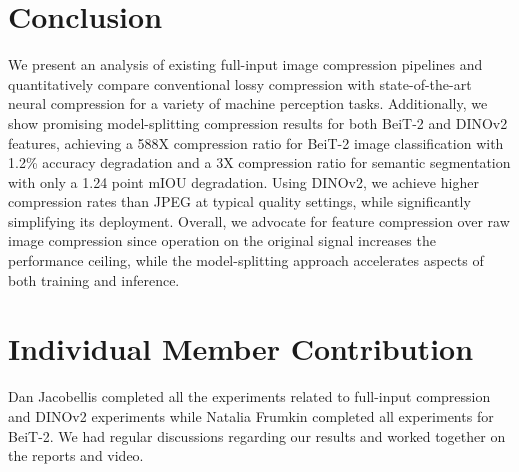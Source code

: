 \documentclass[10pt,twocolumn,letterpaper]{article}
\begin{document}


\section{Conclusion}
We present an analysis of existing full-input image compression pipelines and quantitatively compare conventional lossy compression with state-of-the-art neural compression for a variety of machine perception tasks. Additionally, we show promising model-splitting compression results for both BeiT-2 and DINOv2 features, achieving a 588X compression ratio for BeiT-2 image classification with 1.2\% accuracy degradation and a 3X compression ratio for semantic segmentation with only a 1.24 point mIOU degradation. Using DINOv2, we achieve higher compression rates than JPEG at typical quality settings, while significantly simplifying its deployment. Overall, we advocate for feature compression over raw image compression since operation on the original signal increases the performance ceiling, while the model-splitting approach accelerates aspects of both training and inference.

\section{Individual Member Contribution}
Dan Jacobellis completed all the experiments related to full-input compression and DINOv2 experiments while Natalia Frumkin completed all experiments for BeiT-2. We had regular discussions regarding our results and worked together on the reports and video.


{\small


}
\end{document}

